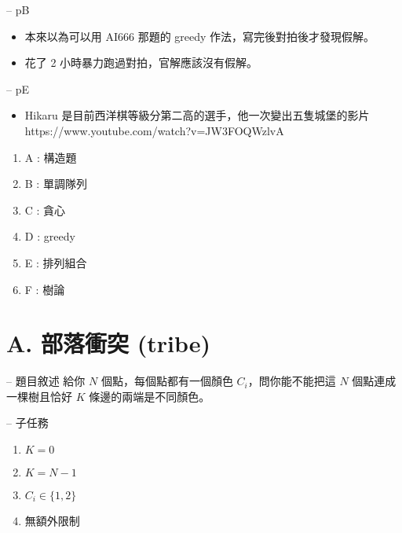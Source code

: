 \documentclass[hyperref,UTF8,notheorems,xcolor={dvipsnames}]{beamer}
\newcommand{\btitle}[1]{{\secname} -- #1}
\theoremstyle{definition}
\begin{document}
\begin{frame}[fragile]{\btitle{pB}}
	\begin{itemize}
		\item 本來以為可以用 AI666 那題的 greedy 作法，寫完後對拍後才發現假解。
		\pause
		\item 花了 2 小時暴力跑過對拍，官解應該沒有假解。
	\end{itemize}
\end{frame}

\begin{frame}[fragile]{\btitle{pE}}
	\begin{itemize}
		\item Hikaru 是目前西洋棋等級分第二高的選手，他一次變出五隻城堡的影片 https://www.youtube.com/watch?v=JW3FOQWzlvA
	\end{itemize}
\end{frame}


\begin{frame}[fragile]{\secname}
	\begin{enumerate}
		\item A : 構造題
		\item B : 單調隊列
		\item C : 貪心
		\item D : greedy
		\item E : 排列組合
		\item F : 樹論
	\end{enumerate}
\end{frame}

\section{A. 部落衝突 (tribe)}


\begin{frame}[fragile]{\btitle{題目敘述}}
	給你 $N$ 個點，每個點都有一個顏色 $C_i$，問你能不能把這 $N$ 個點連成一棵樹且恰好 $K$ 條邊的兩端是不同顏色。
\end{frame}

\begin{frame}[fragile]{\btitle{子任務}}
	\begin{enumerate}
		\item $K = 0$
		\item $K = N - 1$
		\item $C_i \in \{1, 2\}$
		\item 無額外限制
	\end{enumerate}
\end{frame}
\end{document}
